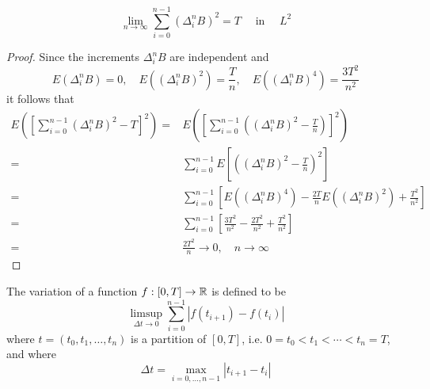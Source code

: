 \begin{theorem} \label{thm:limited-square-variation}
	\begin{equation}
		\lim_{n\rightarrow\infty}\sum_{i=0}^{n-1}\left(\Delta_{i}^{n}B\right)^{2}=T\quad\text { in }\quad L^{2}
	\end{equation}
\end{theorem}

\begin{proof}
	Since the increments $\Delta_{i}^{n}B$ are independent and
	\begin{equation*}
		E\left(\Delta_{i}^{n}B\right)=0,\quad E\left(\left(\Delta_{i}^{n}B\right)^{2}\right)=\frac{T}{n},\quad E\left(\left(\Delta_{i}^{n}B\right)^{4}\right)=\frac{3T^{2}}{n^{2}}
	\end{equation*}
	it follows that
	\begin{equation*}
		\begin{aligned}
			E\left(\left[\sum_{i=0}^{n-1}\left(\Delta_{i}^{n}B\right)^{2}-T\right]^{2}\right)= & E\left(\left[\sum_{i=0}^{n-1}\left(\left(\Delta_{i}^{n}B\right)^{2}-\frac{T}{n}\right)\right]^{2}\right)                                                   \\
			=                                                                                  & \sum_{i=0}^{n-1}E\left[\left(\left(\Delta_{i}^{n}B\right)^{2}-\frac{T}{n}\right)^{2}\right]                                                                \\
			=                                                                                  & \sum_{i=0}^{n-1}\left[E\left(\left(\Delta_{i}^{n}B\right)^{4}\right)-\frac{2T}{n}E\left(\left(\Delta_{i}^{n}B\right)^{2}\right)+\frac{T^{2}}{n^{2}}\right] \\
			=                                                                                  & \sum_{i=0}^{n-1}\left[\frac{3T^{2}}{n^{2}}-\frac{2T^{2}}{n^{2}}+\frac{T^{2}}{n^{2}}\right]                                                                 \\
			=                                                                                  & \frac{2T^{2}}{n}\rightarrow 0,\quad n\rightarrow\infty
		\end{aligned}
	\end{equation*}
\end{proof}

\begin{definition}[Variation]
	The variation of a function $f:[0,T]\rightarrow{\mathbb R}$ is defined to be
	\begin{equation}
		\limsup_{\Delta t\rightarrow 0}\sum_{i=0}^{n-1}\left|f\left(t_{i+1}\right)-f\left(t_{i}\right)\right|
	\end{equation}
	where $t=\left(t_{0},t_{1},\ldots,t_{n}\right)$ is a partition of $[0,T]$, i.e. $0=t_{0}<t_{1}<\cdots<t_{n}=T$, and where
	\begin{equation}
		\Delta t=\max_{i=0,\ldots,n-1}\left|t_{i+1}-t_{i}\right|
	\end{equation}
\end{definition}

